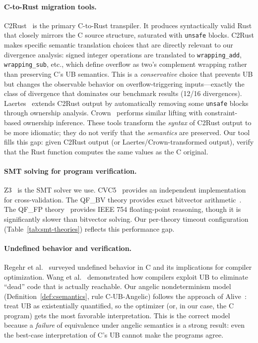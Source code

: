 \documentclass[11pt]{article}
\begin{document}
\paragraph{C-to-Rust migration tools.}
C2Rust~\cite{c2rust2019} is the primary C-to-Rust transpiler. It produces syntactically valid Rust that closely mirrors the C source structure, saturated with \texttt{unsafe} blocks. C2Rust makes specific semantic translation choices that are directly relevant to our divergence analysis: signed integer operations are translated to \texttt{wrapping\_add}, \texttt{wrapping\_sub}, etc., which define overflow as two's complement wrapping rather than preserving C's UB semantics. This is a \emph{conservative} choice that prevents UB but changes the observable behavior on overflow-triggering inputs---exactly the class of divergence that dominates our benchmark results (12/16 divergences). Laertes~\cite{zhang2023laertes} extends C2Rust output by automatically removing some \texttt{unsafe} blocks through ownership analysis. Crown~\cite{zhang2023crown} performs similar lifting with constraint-based ownership inference. These tools transform the \emph{syntax} of C2Rust output to be more idiomatic; they do not verify that the \emph{semantics} are preserved. Our tool fills this gap: given C2Rust output (or Laertes/Crown-transformed output), verify that the Rust function computes the same values as the C original.

\paragraph{SMT solving for program verification.}
Z3~\cite{demoura2008z3} is the SMT solver we use. CVC5~\cite{barbosa2022} provides an independent implementation for cross-validation. The QF\_BV theory provides exact bitvector arithmetic~\cite{hadarean2014}. The QF\_FP theory~\cite{brain2019} provides IEEE 754 floating-point reasoning, though it is significantly slower than bitvector solving. Our per-theory timeout configuration (Table~\ref{tab:smt-theories}) reflects this performance gap.

\paragraph{Undefined behavior and verification.}
Regehr et al.~\cite{regehr2012} surveyed undefined behavior in C and its implications for compiler optimization. Wang et al.~\cite{wang2012} demonstrated how compilers exploit UB to eliminate ``dead'' code that is actually reachable. Our angelic nondeterminism model (Definition~\ref{def:csemantics}, rule C-UB-Angelic) follows the approach of Alive~\cite{lopes2015}: treat UB as existentially quantified, so the optimizer (or, in our case, the C program) gets the most favorable interpretation. This is the correct model because a \emph{failure} of equivalence under angelic semantics is a strong result: even the best-case interpretation of C's UB cannot make the programs agree.
\end{document}
